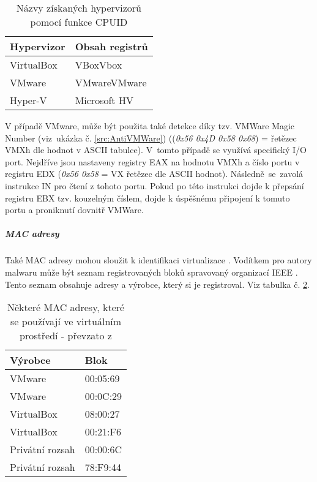 \begin{table}[!ht]
    \centering
    \caption{Názvy získaných hypervizorů pomocí funkce CPUID}
    \label{table:hypervisor_cpuid}
    
    \begin{tabular}{|l|l|}
    \hline
        Hypervizor & Obsah registrů \\
		\hline
		\hline
        VirtualBox & VBoxVbox \\ \hline
        VMware     & VMwareVMware \\ \hline
        Hyper-V & Microsoft HV \\ \hline
    \end{tabular}
\end{table}


V případě VMware, může být použita také detekce díky tzv. VMWare Magic Number \cite{sikorski2012practical} (viz~ukázka č. \ref{src:AntiVMWare}) ((\emph{0x56 0x4D 0x58 0x68}) = řetězec VMXh dle hodnot v ASCII tabulce). V~tomto případě se využívá specifický I/O port. Nejdříve jsou nastaveny registry EAX na hodnotu VMXh a číslo portu v registru EDX (\emph{0x56 0x58} = VX řetězec dle ASCII hodnot). Následně~se~zavolá instrukce IN pro čtení z tohoto portu. Pokud po této instrukci dojde k přepsání registru EBX tzv. kouzelným číslem, dojde k úspěšnému připojení k tomuto portu a proniknutí dovnitř VMWare.

\noindent
\begin{minipage}[t]{1\textwidth}
    
\end{minipage}

\subparagraph*{MAC adresy}

Také MAC adresy mohou sloužit k identifikaci virtualizace  \cite{cyberbit_2016}. Vodítkem pro autory malwaru může být seznam registrovaných bloků spravovaný organizací IEEE \cite{ieee_macs}. Tento seznam obsahuje adresy a výrobce, který si je registroval. Viz tabulka č. \ref{table:macs_vm}.

\begin{table}[!ht]
    \centering
    \caption{Některé MAC adresy, které se používají ve virtuálním prostředí - převzato z \cite{cyberbit_2016}}
    \label{table:macs_vm}
    
    \begin{tabular}{|l|l|}
    \hline
        Výrobce & Blok \\
		\hline
		\hline
        VMware     & 00:05:69 \\ \hline
        VMware     & 00:0C:29 \\ \hline
        VirtualBox & 08:00:27 \\ \hline
        VirtualBox & 00:21:F6 \\ \hline
        Privátní rozsah & 00:00:6C \\ \hline
        Privátní rozsah & 78:F9:44 \\ \hline
    \end{tabular}
\end{table}

